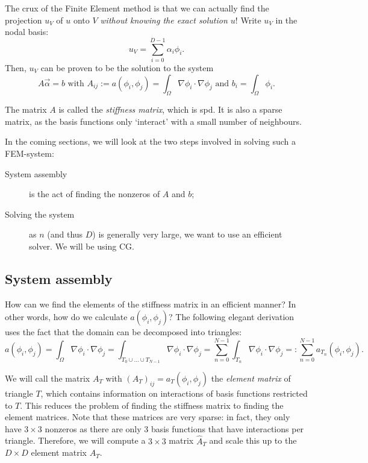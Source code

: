 \documentclass[11pt]{amsart}
\theoremstyle{definition}
\begin{document}
The crux of the Finite Element method is that we can actually find the projection $u_V$ of $u$ onto $V$ \emph{without knowing the exact solution $u$}! Write $u_V$ in the nodal basis:
\[
  u_V = \sum_{i=0}^{D-1} \alpha_i \phi_i.
\]
Then, $u_V$ can be proven \cite{TODO} to be the solution to the system
\[
	A\vec \alpha = b \text{ with }  A_{ij} := a(\phi_i, \phi_j) = \int_\Omega \nabla \phi_i \cdot \nabla \phi_j \text{ and } b_i = \int_\Omega \phi_i.
\]

The matrix $A$ is called the \emph{stiffness matrix}, which is spd.\cite{TODORAYMOND} It is also a sparse matrix, as the basis functions only `interact' with a small number of neighbours.

In the coming sections, we will look at the two steps involved in solving such a FEM-system:
\begin{description}
  \item[System assembly] is the act of finding the nonzeros of $A$ and $b$;
  \item[Solving the system] as $n$ (and thus $D$) is generally very large, we want to use an efficient solver. We will be using CG.
\end{description}

\subsection{System assembly}
How can we find the elements of the stiffness matrix in an efficient manner? In other words, how do we calculate $a(\phi_i, \phi_j)$? The following elegant derivation uses the fact that the domain can be decomposed into triangles:
\begin{equation}
  \label{eqn:div}
	a(\phi_i, \phi_j) = \int_\Omega \nabla \phi_i \cdot \nabla \phi_j = \int_{T_0 \cup \dots \cup T_{N-1}} \nabla \phi_i \cdot \nabla \phi_j = \sum_{n = 0}^{N-1} \int_{T_n} \nabla \phi_i \cdot \nabla \phi_j =: \sum_{n=0}^{N-1}a_{T_n}(\phi_i, \phi_j).
\end{equation}

We will call the matrix $A_T$ with $(A_T)_{ij} = a_T(\phi_i, \phi_j)$ the \emph{element matrix} of triangle $T$, which contains information on interactions of basis functions restricted to $T$. This reduces the problem of finding the stiffness matrix to finding the element matrices. Note that these matrices are very sparse: in fact, they only have $3 \times 3$ nonzeros as there are only 3 basis functions that have interactions per triangle. Therefore, we will compute a $3 \times 3$ matrix $\hat A_T$ and scale this up to the $D \times D$ element matrix $A_T$.
\end{document}
